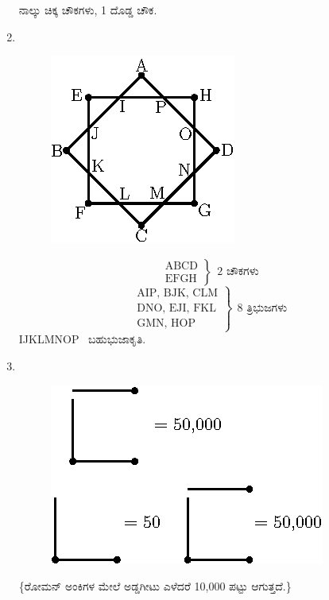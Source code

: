 \begin{enumerate}
ನಾಲ್ಕು ಚಿಕ್ಕ ಚೌಕಗಳು, 1 ದೊಡ್ಡ ಚೌಕ.

\eject

\item 
~

\begin{minipage}[t]{4cm}
\begin{figure}[H]
\centering
\includegraphics{images/chap2/ans14.eps}
\end{figure}
\end{minipage}
\begin{minipage}[t]{5cm}
\begin{equation*}
\left.
\begin{aligned}
\text{ABCD}\\
\text{EFGH}
\end{aligned}
\right\}
~~  2\text{ ಚೌಕಗಳು}
\end{equation*}
\begin{equation*}
\left.
\begin{aligned}
\text{AIP, BJK, CLM}\\
\text{DNO, EJI, FKL}\\
\text{GMN, HOP}
\end{aligned}
\right\}
~~  8\text{  ತ್ರಿಭುಜಗಳು}
\end{equation*}
IJKLMNOP~  ಬಹುಭುಜಾಕೃತಿ.
\end{minipage}

\item 
~

\begin{figure}[H]
\centering
\includegraphics{images/chap2/ans15.eps}
\end{figure}
\{ರೋಮನ್ ಅಂಕಿಗಳ ಮೇಲೆ ಅಡ್ಡಗೀಟು ಎಳೆದರೆ 10,000 ಪಟ್ಟು ಆಗುತ್ತದೆ.\}


\end{enumerate}
